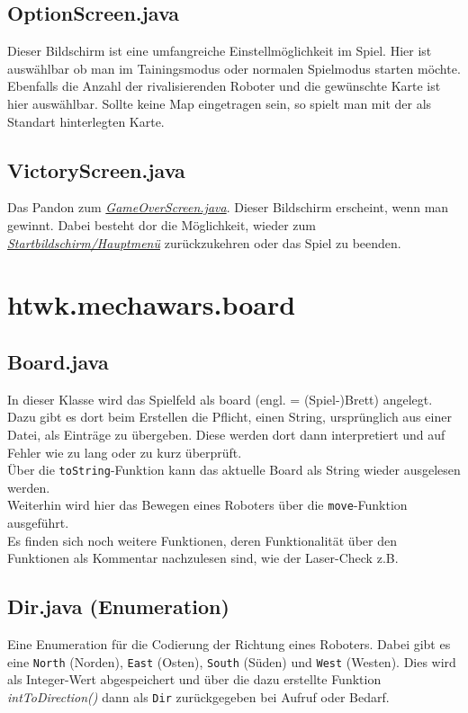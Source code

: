 \documentclass[12pt,a4paper,oneside]{book}
\theoremstyle{plain}
\numberwithin{equation}{chapter} \DeclareMathOperator{\Var}{Var}
\begin{document}
\subsection{OptionScreen.java}
    Dieser Bildschirm ist eine umfangreiche Einstellmöglichkeit im Spiel. Hier ist auswählbar ob man im Tainingsmodus oder normalen Spielmodus starten möchte. Ebenfalls die Anzahl der rivalisierenden Roboter und die gewünschte Karte ist hier auswählbar. Sollte keine Map eingetragen sein, so spielt man mit der als Standart hinterlegten Karte.
  
\subsection{VictoryScreen.java}
    Das Pandon zum \hyperlink{GameOverScreen.java}{\textit{GameOverScreen.java}}.
    Dieser Bildschirm erscheint, wenn man gewinnt. Dabei besteht dor die Möglichkeit, wieder zum \hyperlink{MainMenue.java}{\textit{Startbildschirm/Hauptmenü}} zurückzukehren oder das Spiel zu beenden.
    

\newpage
\section{htwk.mechawars.board}
\subsection{Board.java}
    In dieser Klasse wird das Spielfeld als board (engl. = (Spiel-)Brett) angelegt. Dazu gibt es dort beim Erstellen die Pflicht, einen String, ursprünglich aus einer Datei, als Einträge zu übergeben. Diese werden dort dann interpretiert und auf Fehler wie zu lang oder zu kurz überprüft.\\
    Über die \texttt{toString}-Funktion kann das aktuelle Board als String wieder ausgelesen werden.\\
    Weiterhin wird hier das Bewegen eines Roboters über die \texttt{move}-Funktion ausgeführt.\\
    Es finden sich noch weitere Funktionen, deren Funktionalität über den Funktionen als Kommentar nachzulesen sind, wie der Laser-Check z.B.
    
\hypertarget{Dir.java}{}
\subsection{Dir.java (Enumeration)}
    Eine Enumeration für die Codierung der Richtung eines Roboters. Dabei gibt es eine \texttt{North} (Norden), \texttt{East} (Osten), \texttt{South} (Süden) und \texttt{West} (Westen). Dies wird als Integer-Wert abgespeichert und über die dazu erstellte Funktion \textit{intToDirection()} dann als \texttt{Dir} zurückgegeben bei Aufruf oder Bedarf.
    
\end{document}
